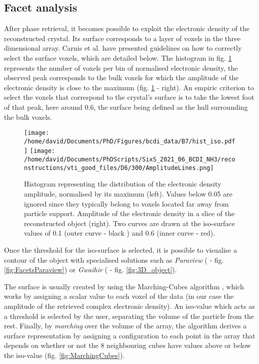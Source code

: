 \subsection{Facet analysis} \label{sec:FacetAnalysis}

After phase retrieval, it becomes possible to exploit the electronic density of the reconstructed crystal.
Its surface corresponds to a layer of voxels in the three dimensional array.
Carnis et al. \parencite*{Carnis2019} have presented guidelines on how to correctly select the surface voxels, which are detailed below.
The histogram in fig. \ref{fig:histo} represents the number of voxels per bin of normalised electronic density, the observed peak corresponds to the bulk voxels for which the amplitude of the electronic density is close to the maximum (fig. \ref{fig:histo} - right).
An empiric criterion to select the voxels that correspond to the crystal's surface is to take the lowest foot of that peak, here around \num{0.6}, the surface being defined as the hull surrounding the bulk voxels.

\begin{figure}[!htb]
   \centering
   \texttt{[image: /home/david/Documents/PhD/Figures/bcdi\_data/B7/hist\_iso.pdf]}
   \texttt{[image: /home/david/Documents/PhDScripts/SixS\_2021\_06\_BCDI\_NH3/reconstructions/vti\_good\_files/D6/300/AmplitudeLines.png]}
   \caption{
   Histogram representing the distribution of the electronic density amplitude, normalised by its maximum (left).
   Values below 0.05 are ignored since they typically belong to voxels located far away from particle support.
   Amplitude of the electronic density in a slice of the reconstructed object (right).
   Two curves are drawn at the iso-surface values of \num{0.1} (outer curve - black ) and \num{0.6} (inner curve - red).
   }
   \label{fig:histo}
\end{figure}

Once the threshold for the iso-surface is selected, it is possible to visualise a contour of the object with specialised solutions such as \textit{Paraview} (\cite{Ahrens2001} - fig. \ref{fig:FacetsParaview}) or \textit{Gwaihir} (\cite{Simonne2022} - fig. \ref{fig:3D_object}).

The surface is usually created by using the Marching-Cubes algorithm \parencite{Lorensen1987}, which works by assigning a scalar value to each voxel of the data (in our case the amplitude of the retrieved complex electronic density).
An iso-value which acts as a threshold is selected by the user, separating the volume of the particle from the rest.
Finally, by \textit{marching} over the volume of the array, the algorithm derives a surface representation by assigning a configuration to each point in the array that depends on whether or not the 8 neighbouring cubes have values above or below the iso-value (fig. \ref{fig:MarchingCubes}).

